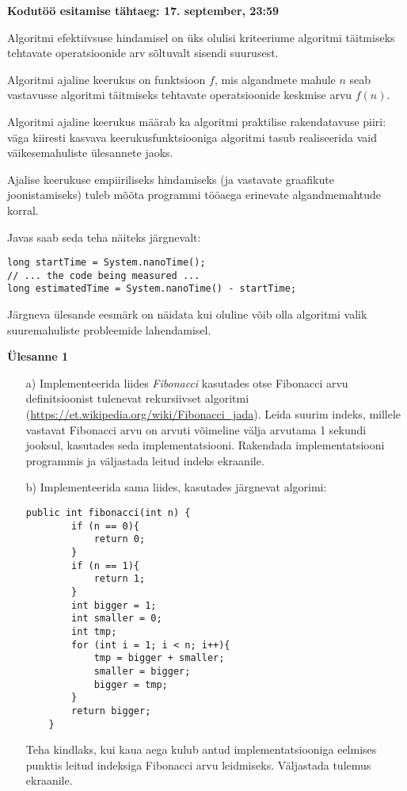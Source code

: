 \documentclass[a4paper]{article}
\begin{document}
\textbf{Kodutöö esitamise tähtaeg: 17. september, 23:59}

Algoritmi efektiivsuse hindamisel on üks olulisi kriteeriume algoritmi
täitmiseks tehtavate operatsioonide arv sõltuvalt sisendi suurusest. 


Algoritmi ajaline keerukus on funktsioon $f$, mis algandmete
mahule $n$ seab vastavusse algoritmi täitmiseks tehtavate operatsioonide keskmise arvu $f(n)$. 

Algoritmi ajaline keerukus määrab ka algoritmi praktilise
rakendatavuse piiri: väga kiiresti kasvava keerukusfunktsiooniga
algoritmi tasub realiseerida vaid väikesemahuliste ülesannete jaoks.

Ajalise keerukuse empiiriliseks hindamiseks (ja vastavate graafikute
joonistamiseks) tuleb mõõta programmi tööaega erinevate algandmemahtude
korral.

Javas saab seda teha näiteks järgnevalt:

\begin{lstlisting}
long startTime = System.nanoTime();    
// ... the code being measured ...    
long estimatedTime = System.nanoTime() - startTime;
\end{lstlisting}

Järgneva ülesande eesmärk on näidata kui oluline võib olla algoritmi valik suuremahuliste probleemide lahendamisel.
\begin{problem}
\textbf{Ülesanne 1}
\begin{enumerate}
   \item[a)] Implementeerida liides \textit{Fibonacci} kasutades otse Fibonacci arvu definitsioonist tulenevat rekursiivset algoritmi (\url{https://et.wikipedia.org/wiki/Fibonacci_jada}). Leida suurim indeks, millele vastavat Fibonacci arvu on 
arvuti võimeline välja arvutama 1 sekundi jooksul, kasutades seda implementatsiooni. Rakendada implementatsiooni programmis ja väljastada leitud indeks ekraanile.
    \item[b)] Implementeerida sama liides, kasutades järgnevat algorimi: 
\begin{lstlisting}
public int fibonacci(int n) {
        if (n == 0){
            return 0;
        }
        if (n == 1){
            return 1;
        }
        int bigger = 1;
        int smaller = 0;
        int tmp;
        for (int i = 1; i < n; i++){
            tmp = bigger + smaller;
            smaller = bigger;
            bigger = tmp;
        }
        return bigger;
    }
\end{lstlisting}
Teha kindlaks, kui kaua aega kulub antud implementatsiooniga eelmises punktis leitud indeksiga Fibonacci arvu leidmiseks. Väljastada tulemus ekraanile.

\end{enumerate}

\end{problem}
\end{document}
